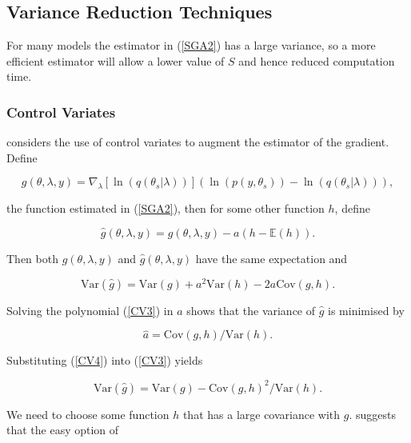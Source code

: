 \documentclass{article}\usepackage[]{graphicx}\usepackage[]{color}
\numberwithin{equation}{section}
\begin{document}
\subsection{Variance Reduction Techniques}

For many models the estimator in (\ref{SGA2}) has a large variance, so a more efficient estimator will allow a lower value of $S$ and hence reduced computation time.
\subsubsection{Control Variates}
\citet{Paisley2012} considers the use of control variates to augment the estimator of the gradient. Define

\begin{equation}
\label{CV1}
g(\theta, \lambda, y) =  \nabla_{\lambda} [\ln(q(\theta_s | \lambda))] (\ln (p(y, \theta_s)) - \ln(q(\theta_s | \lambda))),
\end{equation}

the function estimated in (\ref{SGA2}), then for some other function $h$, define

\begin{equation}
\label{CV2}
\hat{g}(\theta, \lambda, y) = g(\theta, \lambda, y) - a(h - \mathbb{E}(h)).
\end{equation}

Then both $g(\theta, \lambda, y)$ and $\hat{g}(\theta, \lambda, y)$ have the same expectation and

\begin{equation}
\label{CV3}
\mbox{Var}(\hat{g}) = \mbox{Var}(g) + a^2 \mbox{Var}(h) - 2a\mbox{Cov}(g, h). 
\end{equation}

Solving the polynomial (\ref{CV3}) in $a$ shows that the variance of $\hat{g}$ is minimised by 

\begin{equation}
\label{CV4}
\hat{a} = \mbox{Cov}(g, h)/\mbox{Var}(h).
\end{equation}

Substituting (\ref{CV4}) into (\ref{CV3}) yields

\begin{equation}
\label{CV5}
\mbox{Var}(\hat{g}) = \mbox{Var}(g) - \mbox{Cov}(g, h)^2/\mbox{Var}(h).
\end{equation}

We need to choose some function $h$ that has a large covariance with $g$. \citet{Ranganath2014} suggests that the easy option of
\end{document}
